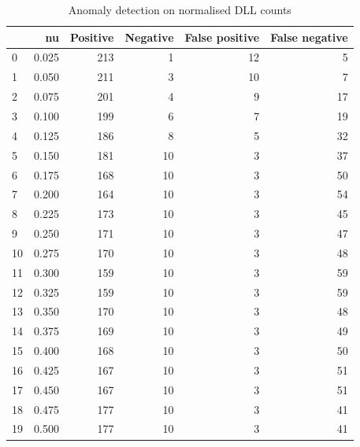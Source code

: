 \documentclass[a4paper,twoside,12pt]{book}
\begin{document}
\begin{appendices}
\begin{table}
	\centering
	\caption{Anomaly detection on normalised DLL counts}
	\label{id:tab:countOCSVM}
	\begin{tabular}{lrrrrr}
		\toprule
		{} &     nu &  Positive &  Negative &  False positive &  False negative \\
		\midrule
		0  &  0.025 &       213 &         1 &              12 &               5 \\
		1  &  0.050 &       211 &         3 &              10 &               7 \\
		2  &  0.075 &       201 &         4 &               9 &              17 \\
		3  &  0.100 &       199 &         6 &               7 &              19 \\
		4  &  0.125 &       186 &         8 &               5 &              32 \\
		5  &  0.150 &       181 &        10 &               3 &              37 \\
		6  &  0.175 &       168 &        10 &               3 &              50 \\
		7  &  0.200 &       164 &        10 &               3 &              54 \\
		8  &  0.225 &       173 &        10 &               3 &              45 \\
		9  &  0.250 &       171 &        10 &               3 &              47 \\
		10 &  0.275 &       170 &        10 &               3 &              48 \\
		11 &  0.300 &       159 &        10 &               3 &              59 \\
		12 &  0.325 &       159 &        10 &               3 &              59 \\
		13 &  0.350 &       170 &        10 &               3 &              48 \\
		14 &  0.375 &       169 &        10 &               3 &              49 \\
		15 &  0.400 &       168 &        10 &               3 &              50 \\
		16 &  0.425 &       167 &        10 &               3 &              51 \\
		17 &  0.450 &       167 &        10 &               3 &              51 \\
		18 &  0.475 &       177 &        10 &               3 &              41 \\
		19 &  0.500 &       177 &        10 &               3 &              41 \\

\end{tabular}
\end{table}
\end{appendices}
\end{document}
